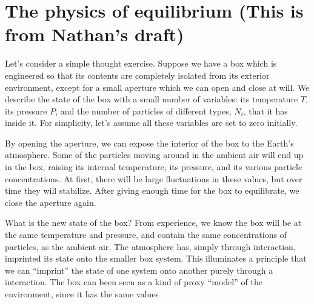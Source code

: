 \documentclass[nofootinbib, superscriptaddress, prl]{revtex4}
\begin{document}
%
%


\section{The physics of equilibrium (This is from Nathan's draft)}



Let's consider a simple thought exercise. Suppose we have a box which is engineered so that its contents are completely isolated from its exterior environment, except for a small aperture which we can open and close at will. We describe the state of the box with a small number of variables: its temperature $T$, its pressure $P$, and the number of particles of different types, $N_i$, that it has inside it. For simplicity, let's assume all these variables are set to zero initially. 

By opening the aperture, we can expose the interior of the box to the Earth's atmosphere. Some of the particles moving around in the ambient air will end up in the box, raising its internal temperature, its pressure, and its various particle concentrations. At first, there will be large fluctuations in these values, but over time they will stabilize. After giving enough time for the box to equilibrate, we close the aperture again. 

What is the new state of the box? From experience, we know the box will be at the same temperature and pressure, and contain the same concentrations of particles, as the ambient air. The atmosphere has, simply through interaction, imprinted its state onto the smaller box system. 
This illuminates a principle that we can ``imprint'' the state of one system onto another purely through a interaction. The box can been seen as a kind of proxy ``model'' of the environment, since it has the same values 
\end{document}

